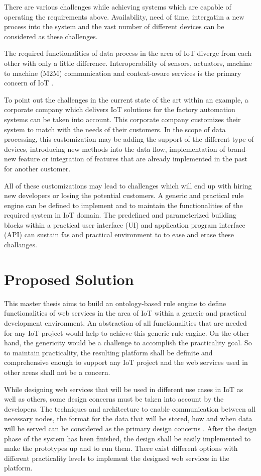 There are various challenges while achieving systems which are capable of operating the requirements above. Availability, need of time, intergatiın a new process into the system and the vast number of different devices can be considered as these challenges.

The required functionalities of data process in the area of IoT diverge from each other with only a little difference. Interoperability of sensors, actuators, machine to machine (M2M) communication and context-aware services is the primary concern of IoT \cite{6651222}. 

To point out the challenges in the current state of the art within an example, a corporate company which delivers IoT solutions for the factory automation systems can be taken into account. This corporate company customizes their system to match with the needs of their customers. In the scope of data processing, this customization may be adding the support of the different type of devices, introducing new methods into the data flow, implementation of brand-new feature or integration of features that are already implemented in the past for another customer.

All of these customizations may lead to challenges which will end up with hiring new developers or losing the potential customers. A generic and practical rule engine can be defined to implement and to maintain the functionalities of the required system in IoT domain. The predefined and parameterized building blocks within a practical user interface (UI) and application program interface (API) can sustain fas and practical environment to to ease and erase these challanges.

\section{Proposed Solution}

This master thesis aims to build an ontology-based rule engine to define functionalities of web services in the area of IoT within a generic and practical development environment. An abstraction of all functionalities that are needed for any IoT project would help to achieve this generic rule engine. On the other hand, the genericity would be a challenge to accomplish the practicality goal. So to maintain practicality, the resulting platform shall be definite and comprehensive enough to support any IoT project and the web services used in other areas shall not be a concern. 

While designing web services that will be used in different use cases in IoT as well as others, some design concerns must be taken into account by the developers. The techniques and architecture to enable communication between all necessary nodes, the format for the data that will be stored, how and when data will be served can be considered as the primary design concerns \cite{6651222}. After the design phase of the system has been finished, the design shall be easily implemented to make the prototypes up and to run them. 
There exist different options with different practicality levels to implement the designed web services in the platform. 

